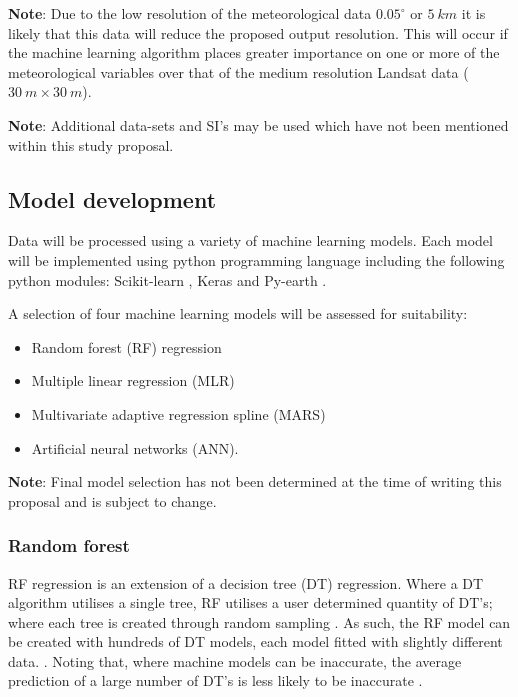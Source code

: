 
\textbf{Note}: Due to the low resolution of the meteorological data $0.05^{\circ}$ or $5 \ km$ it is likely that this data will reduce the proposed output resolution. This will occur if the machine learning algorithm places greater importance on one or more of the meteorological variables over that of the medium resolution Landsat data ($30 \ m \times 30 \ m$).

\textbf{Note}: Additional data-sets and SI's may be used which have not been mentioned within this study proposal.

\subsection{Model development}
Data will be processed using a variety of machine learning models. Each model will be implemented using python programming language including the following python modules: Scikit-learn \citep{sklearn2011}, Keras \citep{Korstanje2021} and Py-earth \citep{pyearth2013}.

A selection of four machine learning models will be assessed for suitability:
\begin{itemize}
    \item Random forest (RF) regression
    \item Multiple linear regression (MLR)
    \item Multivariate adaptive regression spline (MARS)
    \item Artificial neural networks (ANN).
\end{itemize}

\textbf{Note}: Final model selection has not been determined at the time of writing this proposal and is subject to change.

\subsubsection{Random forest}
RF regression is an extension of a decision tree (DT) regression. Where a DT algorithm utilises a single tree, RF utilises a user determined quantity of DT's; where each tree is created through random sampling \citep{Armstrongetal.2009, wuetal2022}. As such, the RF model can be created with hundreds of DT models, each model fitted with slightly different data. \citep{Korstanje2021}. Noting that, where machine models can be inaccurate, the average prediction of a large number of DT's is less likely to be inaccurate \citep{Korstanje2021, wuetal2022}.

